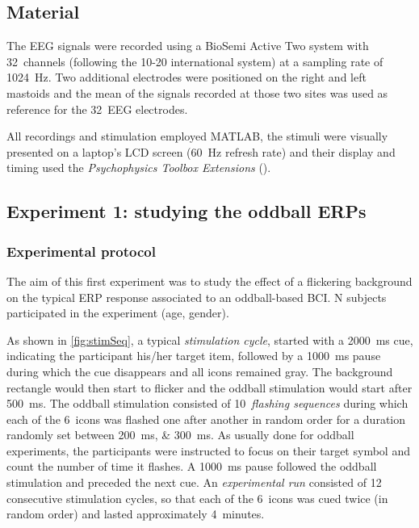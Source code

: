 \documentclass[10pt]{article}
\begin{document}
    \subsection{Material}
    \label{sec:2.1Material}
    
    The EEG signals were recorded using a BioSemi Active Two system with 32~channels (following the 10-20 international system) at a sampling rate of \SI{1024}{\Hz}.
    Two additional electrodes were positioned on the right and left mastoids and the mean of the signals recorded at those two sites was used as reference for the 32~EEG electrodes.

    All recordings and stimulation employed MATLAB\textsuperscript{\textregistered}, the stimuli were visually presented on a laptop's LCD screen (\SI{60}{\Hz} refresh rate) and their display and timing used the \emph{Psychophysics Toolbox Extensions} (\cite{Brainard1997,Pelli1997}).



    \subsection{Experiment 1: studying the oddball ERPs}
    \label{sec:2.2Oddball}

        \subsubsection{Experimental protocol}
        \label{sec:2.2.1Protocol}
        
        The aim of this first experiment was to study the effect of a flickering background on the typical ERP response associated to an oddball-based BCI.
        N subjects participated in the experiment (age, gender).

        As shown in \autoref{fig:stimSeq}, a typical \emph{stimulation cycle}, started with a \SI{2000}{\ms} cue, indicating the participant his/her target item, followed by a \SI{1000}{\ms} pause during which the cue disappears and all icons remained gray.
        The background rectangle would then start to flicker and the oddball stimulation would start after \SI{500}{\ms}.
        The oddball stimulation consisted of 10~\emph{flashing sequences} during which each of the 6~icons was flashed one after another in random order for a duration randomly set between \SIlist[list-units = single]{200;300}{\ms}.
        As usually done for oddball experiments, the participants were instructed to focus on their target symbol and count the number of time it flashes.
        A \SI{1000}{\ms} pause followed the oddball stimulation and preceded the next cue.
        An \emph{experimental run} consisted of 12 consecutive stimulation cycles, so that each of the 6~icons was cued twice (in random order) and lasted approximately 4~minutes.
        
\end{document}
